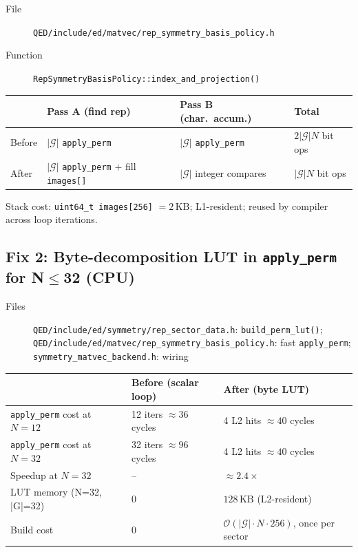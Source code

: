 \documentclass[11pt,a4paper]{article}
\begin{document}
\begin{description}
  \item[File] \texttt{QED/include/ed/matvec/rep\_symmetry\_basis\_policy.h}
  \item[Function] \texttt{RepSymmetryBasisPolicy::index\_and\_projection()}
\end{description}

\begin{center}
\begin{tabular}{@{}llll@{}}
\toprule
 & Pass A (find rep) & Pass B (char.\ accum.) & Total \\
\midrule
Before & $|\mathcal{G}|$ \texttt{apply\_perm} & $|\mathcal{G}|$ \texttt{apply\_perm} & $2|\mathcal{G}|N$ bit ops \\
After  & $|\mathcal{G}|$ \texttt{apply\_perm} $+$ fill \texttt{images[]} & $|\mathcal{G}|$ integer compares & $|\mathcal{G}|N$ bit ops \\
\bottomrule
\end{tabular}
\end{center}

Stack cost: \texttt{uint64\_t images[256]} $= 2\,\mathrm{KB}$;
L1-resident; reused by compiler across loop iterations.

\subsection{Fix 2: Byte-decomposition LUT in \texttt{apply\_perm} for N\texorpdfstring{$\le$}{<=}32 (CPU)}

\begin{description}
  \item[Files] \texttt{QED/include/ed/symmetry/rep\_sector\_data.h}:
    \texttt{build\_perm\_lut()};
    \texttt{QED/include/ed/matvec/rep\_symmetry\_basis\_policy.h}: fast
    \texttt{apply\_perm}; \texttt{symmetry\_matvec\_backend.h}: wiring
\end{description}

\begin{center}
\begin{tabular}{@{}lll@{}}
\toprule
 & \textbf{Before (scalar loop)} & \textbf{After (byte LUT)} \\
\midrule
\texttt{apply\_perm} cost at $N=12$ & 12 iters $\approx 36$ cycles & 4 L2 hits $\approx 40$ cycles \\
\texttt{apply\_perm} cost at $N=32$ & 32 iters $\approx 96$ cycles & 4 L2 hits $\approx 40$ cycles \\
Speedup at $N=32$ & -- & $\approx 2.4\times$ \\
LUT memory (N=32, |G|=32) & 0 & $128\,\mathrm{KB}$ (L2-resident) \\
Build cost & 0 & $\mathcal{O}(|\mathcal{G}|\cdot N \cdot 256)$, once per sector \\
\bottomrule
\end{tabular}
\end{center}
\end{document}
